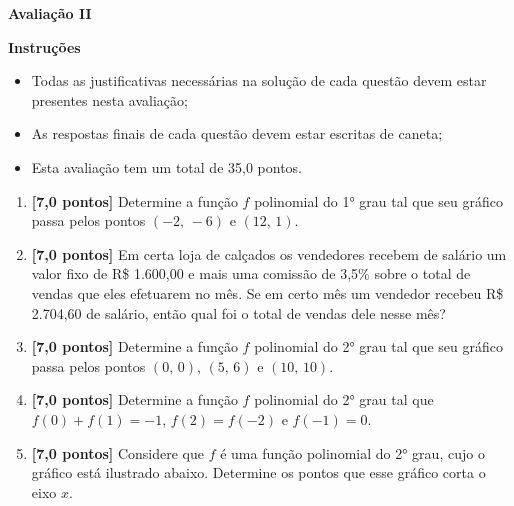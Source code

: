 \documentclass[12pt,a4paper]{article}
\begin{document}
\begin{center}
 \textbf{Avaliação II}
\end{center}

\textbf{Instruções}
\begin{itemize}
 \item Todas as justificativas necessárias na solução de cada questão devem estar presentes nesta avaliação;
 \item As respostas finais de cada questão devem estar escritas de caneta;
 \item Esta avaliação tem um total de 35,0 pontos.
\end{itemize}

\begin{enumerate}
  \item \textbf{[7,0 pontos]} Determine a função $f$ polinomial do 1° grau tal que seu gráfico passa
  pelos pontos $(-2,\,-6)$ e $(12,\,1)$.

  \item \textbf{[7,0 pontos]} Em certa loja de calçados os vendedores recebem de salário 
  um valor fixo de R\$ 1.600,00 e mais uma comissão de 3,5\% sobre o total de
  vendas que eles efetuarem no mês. Se em certo mês um vendedor recebeu
  R\$ 2.704,60 de salário, então qual foi o total de vendas dele nesse mês?

  \item \textbf{[7,0 pontos]} Determine a função $f$ polinomial do 2° grau tal que seu gráfico passa
  pelos pontos $(0,\,0)$, $(5,\,6)$ e $(10,\,10)$.

  \item \textbf{[7,0 pontos]} Determine a função $f$ polinomial do 2° grau tal que $f(0) + f(1) = -1$,
    $f(2) = f(-2)$ e $f(-1) = 0$.

  \item \textbf{[7,0 pontos]} Considere que $f$ é uma função polinomial do 2° grau, cujo o gráfico está
  ilustrado abaixo. Determine os pontos que esse gráfico corta o eixo $x$.


\end{enumerate}
\end{document}
